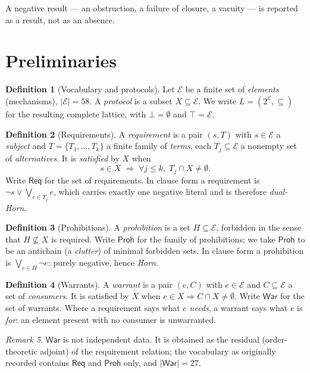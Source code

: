 \documentclass[11pt]{article}
\theoremstyle{definition}
\newtheorem{definition}{Definition}[section]
\theoremstyle{plain}
\theoremstyle{remark}
\newtheorem{remark}[definition]{Remark}
\newcommand{\El}{\mathcal{E}}
\newcommand{\Law}{\mathsf{Req}}
\newcommand{\Haz}{\mathsf{Proh}}
\newcommand{\War}{\mathsf{War}}
\begin{document}
A negative result --- an obstruction, a failure of closure, a vacuity --- is
reported as a result, not as an absence.

\section{Preliminaries}

\begin{definition}[Vocabulary and protocols]
Let $\El$ be a finite set of \emph{elements} (mechanisms), $|\El| = 58$. A
\emph{protocol} is a subset $X \subseteq \El$. We write
$L = (2^{\El}, \subseteq)$ for the resulting complete lattice, with
$\bot = \emptyset$ and $\top = \El$.
\end{definition}

\begin{definition}[Requirements]
A \emph{requirement} is a pair $(s, T)$ with $s \in \El$ a \emph{subject} and
$T = \{T_1,\dots,T_k\}$ a finite family of \emph{terms}, each $T_j \subseteq \El$
a nonempty set of \emph{alternatives}. It is \emph{satisfied} by $X$ when
\[
  s \in X \;\Longrightarrow\; \forall j \le k,\; T_j \cap X \neq \emptyset .
\]
Write $\Law$ for the set of requirements. In clause form a requirement is
$\neg s \vee \bigvee_{e \in T_j} e$, which carries exactly one negative literal
and is therefore \emph{dual-Horn}.
\end{definition}

\begin{definition}[Prohibitions]
A \emph{prohibition} is a set $H \subseteq \El$, forbidden in the sense that
$H \not\subseteq X$ is required. Write $\Haz$ for the family of prohibitions; we
take $\Haz$ to be an antichain (a \emph{clutter}) of minimal forbidden sets. In
clause form a prohibition is $\bigvee_{e \in H} \neg e$: purely negative, hence
\emph{Horn}.
\end{definition}

\begin{definition}[Warrants]
A \emph{warrant} is a pair $(e, C)$ with $e \in \El$ and $C \subseteq \El$ a set
of \emph{consumers}. It is satisfied by $X$ when
$e \in X \Rightarrow C \cap X \neq \emptyset$. Write $\War$ for the set of
warrants. Where a requirement says what $e$ \emph{needs}, a warrant says what $e$
is \emph{for}: an element present with no consumer is unwarranted.
\end{definition}

\begin{remark}
$\War$ is not independent data. It is obtained as the residual (order-theoretic
adjoint) of the requirement relation; the vocabulary as originally recorded
contains $\Law$ and $\Haz$ only, and $|\War| = 27$.
\end{remark}
\end{document}
